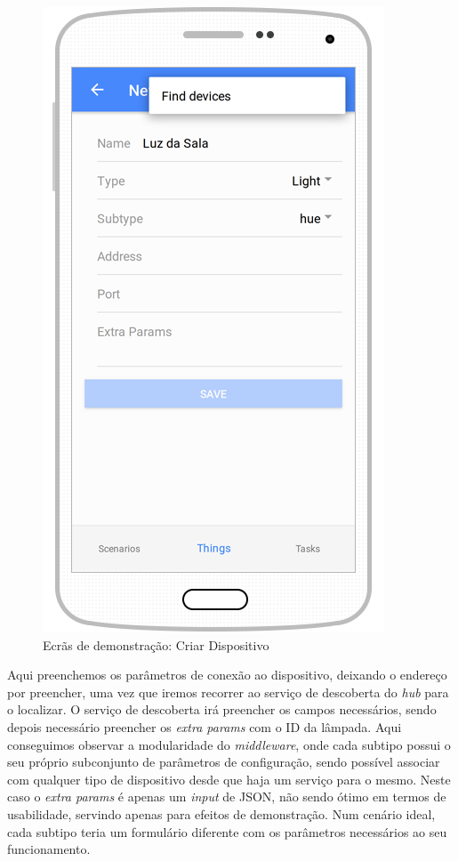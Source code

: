 \begin{figure}[H]
  \centering
        \includegraphics[scale=0.75]{img/demo/new_thing.png}
  \caption{Ecrãs de demonstração: Criar Dispositivo}
\end{figure}

Aqui preenchemos os parâmetros de conexão ao dispositivo, deixando o endereço por preencher, uma vez que iremos recorrer ao serviço de descoberta do \textit{hub} para o localizar. O serviço de descoberta irá preencher os campos necessários, sendo depois necessário preencher os \textit{extra params} com o ID da lâmpada. Aqui conseguimos observar a modularidade do \textit{middleware}, onde cada subtipo possui o seu próprio subconjunto de parâmetros de configuração, sendo possível associar com qualquer tipo de dispositivo desde que haja um serviço para o mesmo. Neste caso o \textit{extra params} é apenas um \textit{input} de JSON, não sendo ótimo em termos de usabilidade, servindo apenas para efeitos de demonstração. Num cenário ideal, cada subtipo teria um formulário diferente com os parâmetros necessários ao seu funcionamento.

